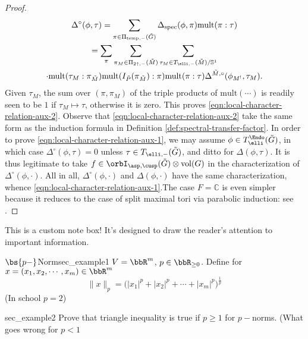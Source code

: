 \documentclass[11pt, a3paper, openany]{article}
\newcommand{\CC}{\ensuremath{\mathbb{C}}}
\newcommand{\mes}{\operatorname{vol}}
\theoremstyle{remark}
\theoremstyle{remark}
\theoremstyle{remark}
\newenvironment{Proof of claim}
  {\begin{proof}[\normalfont \textbf{Proof of claim}]}
  {\end{proof}}
\theoremstyle{definition}
\theoremstyle{remark}
\theoremstyle{plain}
\begin{document}
\begin{proof}
\begin{multline*}
\Delta^\circ(\phi, \tau) = \sum_{\pi \in \Pi_{\mathrm{temp}, -}(\tilde{G})} \Delta_{\mathrm{spec}}(\phi, \pi) \mathrm{mult}(\pi : \tau) \\
		= \sum_\pi \sum_{\pi_M \in \Pi_{2\uparrow, -}(\tilde{M})} \sum_{\tau_M \in T_{\elli, -}(\tilde{M})/\mathbb{S}^1} \\
		\cdot \mathrm{mult}(\tau_M : \pi_{\tilde{M}}) \mathrm{mult}(I_{\tilde{P}}(\pi_{\tilde{M}}) : \pi ) \mathrm{mult}(\pi : \tau) \Delta^{\tilde{M}, \circ}(\phi_{M^!}, \tau_M).
\end{multline*} Given $\tau_M$, the sum over $(\pi, \pi_M)$ of the triple products of $\mathrm{mult}(\cdots)$ is readily seen to be $1$ if $\tau_M \mapsto \tau$, otherwise it is zero. This proves \eqref{eqn:local-character-relation-aux-2}. Observe that \eqref{eqn:local-character-relation-aux-2} take the same form as the induction formula in Definition \ref{def:spectral-transfer-factor}. In order to prove \eqref{eqn:local-character-relation-aux-1}, we may assume $\phi \in T^{\Endo}_{\elli}(\tilde{G})$, in which case $\Delta^\circ(\phi, \tau) = 0$ unless $\tau \in T_{\elli, -}(\tilde{G})$, and ditto for $\Delta(\phi, \tau)$. It is thus legitimate to take $f \in \orbI_{\asp, \cusp}(\tilde{G}) \otimes \mes(G)$ in the characterization of $\Delta^\circ(\phi, \cdot)$. All in all, $\Delta^\circ(\phi, \cdot)$ and $\Delta(\phi, \cdot)$ have the same characterization, whence \eqref{eqn:local-character-relation-aux-1}.The case $F = \CC$ is even simpler because it reduces to the case of split maximal tori via parabolic induction: see \cite[\S 7.6]{Li19}.
\end{proof}
\begin{note}
This is a custom note box! It's designed to draw the reader's attention to important information.
\end{note}
\begin{Example}{$\bs{p-}$Norm}{sec_example1}
\label{pnorm}$V={\bbR}^m$, $p\in\bbR_{\geq 0}$. Define for $x=(x_1,x_2,\cdots,x_m)\in\bbR^m$ $$\|x\|_p=\Big(|x_1|^p+|x_2|^p+\cdots+|x_m|^p\Big)^{\frac1p}$$(In school $p=2$)
\end{Example}
\begin{Example}{}{sec_example2}
Prove that triangle inequality is true if $p\geq 1$ for $p-$norms. (What goes wrong for $p<1$
\end{Example}
\end{document}
